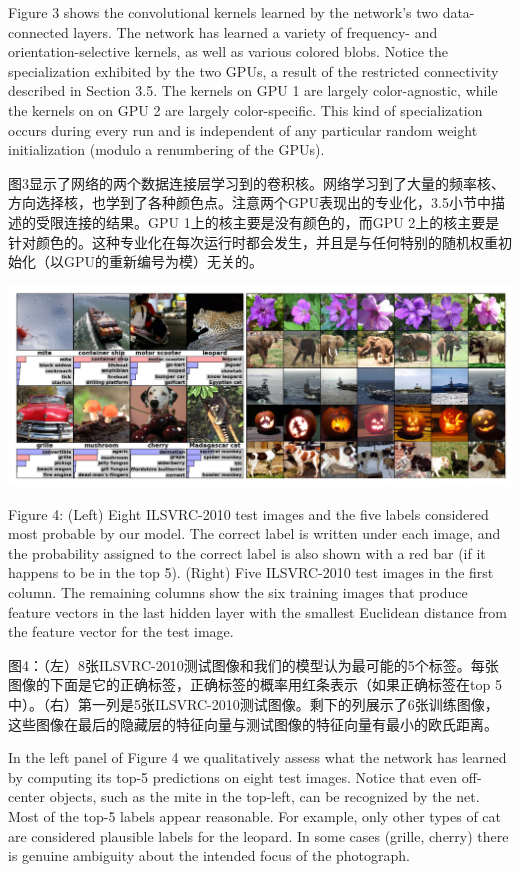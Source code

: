 \documentclass[12pt,a4paper,UTF8,twoside]{book}
\begin{document}
Figure 3 shows the convolutional kernels learned by the network's two data-connected layers. The network has learned a variety of frequency- and orientation-selective kernels, as well as various colored blobs. Notice the specialization exhibited by the two GPUs, a result of the restricted connectivity described in Section 3.5. The kernels on GPU 1 are largely color-agnostic, while the kernels on on GPU 2 are largely color-specific. This kind of specialization occurs during every run and is independent of any particular random weight initialization (modulo a renumbering of the GPUs).

图3显示了网络的两个数据连接层学习到的卷积核。网络学习到了大量的频率核、方向选择核，也学到了各种颜色点。注意两个GPU表现出的专业化，3.5小节中描述的受限连接的结果。GPU 1上的核主要是没有颜色的，而GPU 2上的核主要是针对颜色的。这种专业化在每次运行时都会发生，并且是与任何特别的随机权重初始化（以GPU的重新编号为模）无关的。

\begin{center}\includegraphics[width=0.7\linewidth]{img/01-04} \end{center}

Figure 4: (Left) Eight ILSVRC-2010 test images and the five labels considered most probable by our model. The correct label is written under each image, and the probability assigned to the correct label is also shown with a red bar (if it happens to be in the top 5). (Right) Five ILSVRC-2010 test images in the first column. The remaining columns show the six training images that produce feature vectors in the last hidden layer with the smallest Euclidean distance from the feature vector for the test image.

图4：（左）8张ILSVRC-2010测试图像和我们的模型认为最可能的5个标签。每张图像的下面是它的正确标签，正确标签的概率用红条表示（如果正确标签在top 5中）。（右）第一列是5张ILSVRC-2010测试图像。剩下的列展示了6张训练图像，这些图像在最后的隐藏层的特征向量与测试图像的特征向量有最小的欧氏距离。

In the left panel of Figure 4 we qualitatively assess what the network has learned by computing its top-5 predictions on eight test images. Notice that even off-center objects, such as the mite in the top-left, can be recognized by the net. Most of the top-5 labels appear reasonable. For example, only other types of cat are considered plausible labels for the leopard. In some cases (grille, cherry) there is genuine ambiguity about the intended focus of the photograph.
\end{document}
